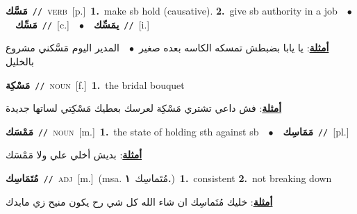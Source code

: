 \documentclass[10pt,a4paper,twoside]{article} %
\begin{document}
\begin{multicols}{2}
{\setlength\topsep{0pt}\textbf{\foreignlanguage{arabic}{مَسَّك}}\ {\color{gray}\texttt{//}\color{black}}\ \textsc{verb}\ [p.]\ \textbf{1.}~make sb hold (causative).  \textbf{2.}~give sb authority in a job\ \ $\bullet$\ \ \setlength\topsep{0pt}\textbf{\foreignlanguage{arabic}{مَسِّك}}\ {\color{gray}\texttt{//}\color{black}}\ [c.]\ \ $\bullet$\ \ \setlength\topsep{0pt}\textbf{\foreignlanguage{arabic}{يمَسِّك}}\ {\color{gray}\texttt{//}\color{black}}\ [i.]\  \begin{flushright}\color{gray}\foreignlanguage{arabic}{\textbf{\underline{\foreignlanguage{arabic}{أمثلة}}}: يا يابا بضبطش تمسكه الكاسه بعده صغير\ $\bullet$\ \  المدير اليوم مَسَّكني مشروع بالخليل}\end{flushright}\color{black}} \vspace{2mm}

{\setlength\topsep{0pt}\textbf{\foreignlanguage{arabic}{مَسْكِة}}\ {\color{gray}\texttt{//}\color{black}}\ \textsc{noun}\ [f.]\ \textbf{1.}~the bridal bouquet\  \begin{flushright}\color{gray}\foreignlanguage{arabic}{\textbf{\underline{\foreignlanguage{arabic}{أمثلة}}}: فش داعي تشتري مَسْكِة لعرسك بعطيك مَسْكِتي لساتها جديدة}\end{flushright}\color{black}} \vspace{2mm}

{\setlength\topsep{0pt}\textbf{\foreignlanguage{arabic}{مَمْسَك}}\ {\color{gray}\texttt{//}\color{black}}\ \textsc{noun}\ [m.]\ \textbf{1.}~the state of holding sth against sb\ \ $\bullet$\ \ \setlength\topsep{0pt}\textbf{\foreignlanguage{arabic}{مَمَاسِك}}\ {\color{gray}\texttt{//}\color{black}}\ [pl.]\  \begin{flushright}\color{gray}\foreignlanguage{arabic}{\textbf{\underline{\foreignlanguage{arabic}{أمثلة}}}: بديش أخلي علي ولا مَمْسَك}\end{flushright}\color{black}} \vspace{2mm}

{\setlength\topsep{0pt}\textbf{\foreignlanguage{arabic}{مُتَمَاسِك}}\ {\color{gray}\texttt{//}\color{black}}\ \textsc{adj}\ [m.]\ \color{gray}(msa. \foreignlanguage{arabic}{مُتَماسِك}~\foreignlanguage{arabic}{\textbf{١.}})\color{black}\ \textbf{1.}~consistent  \textbf{2.}~not breaking down\  \begin{flushright}\color{gray}\foreignlanguage{arabic}{\textbf{\underline{\foreignlanguage{arabic}{أمثلة}}}: خليك مُتَماسِك ان شاء الله كل شي رح يكون منيح زي مابدك}\end{flushright}\color{black}} \vspace{2mm}


\end{multicols}
\end{document}
